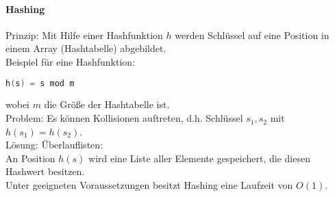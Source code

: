 \paragraph{Hashing}
Prinzip: Mit Hilfe einer Hashfunktion $h$ werden Schlüssel auf eine Position in einem Array (Hashtabelle) abgebildet.\\
Beispiel für eine Hashfunktion:
\begin{lstlisting}[language=C]
h(s) = s mod m
\end{lstlisting}
wobei $m$ die Größe der Hashtabelle ist.\\
Problem: Es können Kollisionen auftreten, d.h. Schlüssel $s_1,s_2$ mit $h(s_1)=h(s_2)$. \\
Lösung: Überlauflisten:\\
An Position $h(s)$ wird eine Liste aller Elemente gespeichert, die diesen Hashwert besitzen.\\
Unter geeigneten Voraussetzungen besitzt Hashing eine Laufzeit von $O(1)$.

\newpage
\printbibliography
